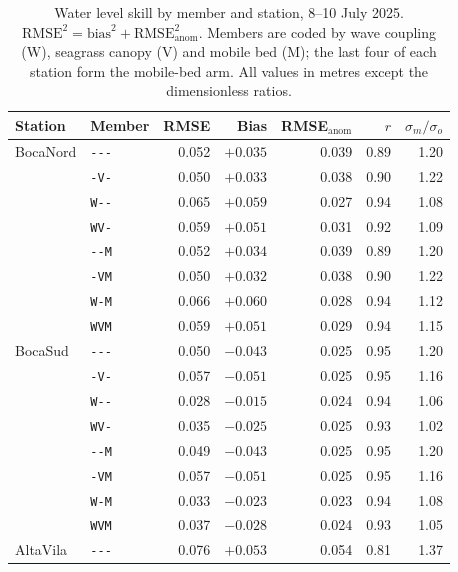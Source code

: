 \begin{table}[H]
  \centering
  \caption{Water level skill by member and station, 8--10 July 2025.
  $\mathrm{RMSE}^2 = \mathrm{bias}^2 + \mathrm{RMSE}_{\mathrm{anom}}^2$. Members
  are coded by wave coupling (W), seagrass canopy (V) and mobile bed (M); the
  last four of each station form the mobile-bed arm. All values in metres
  except the dimensionless ratios.}
  \label{tab:wl}
  \begin{tabular}{llrrrrr}
    \toprule
    Station & Member & RMSE & Bias & RMSE$_{\mathrm{anom}}$ & $r$ & $\sigma_m/\sigma_o$ \\
    \midrule
    BocaNord & \texttt{{-}{-}{-}}  & 0.052 & $+0.035$ & 0.039 & 0.89 & 1.20 \\
             & \texttt{{-}V{-}}    & 0.050 & $+0.033$ & 0.038 & 0.90 & 1.22 \\
             & \texttt{W{-}{-}}    & 0.065 & $+0.059$ & 0.027 & 0.94 & 1.08 \\
             & \texttt{WV{-}}      & 0.059 & $+0.051$ & 0.031 & 0.92 & 1.09 \\
             & \texttt{{-}{-}M}    & 0.052 & $+0.034$ & 0.039 & 0.89 & 1.20 \\
             & \texttt{{-}VM}      & 0.050 & $+0.032$ & 0.038 & 0.90 & 1.22 \\
             & \texttt{W{-}M}      & 0.066 & $+0.060$ & 0.028 & 0.94 & 1.12 \\
             & \texttt{WVM}        & 0.059 & $+0.051$ & 0.029 & 0.94 & 1.15 \\
    \midrule
    BocaSud  & \texttt{{-}{-}{-}}  & 0.050 & $-0.043$ & 0.025 & 0.95 & 1.20 \\
             & \texttt{{-}V{-}}    & 0.057 & $-0.051$ & 0.025 & 0.95 & 1.16 \\
             & \texttt{W{-}{-}}    & 0.028 & $-0.015$ & 0.024 & 0.94 & 1.06 \\
             & \texttt{WV{-}}      & 0.035 & $-0.025$ & 0.025 & 0.93 & 1.02 \\
             & \texttt{{-}{-}M}    & 0.049 & $-0.043$ & 0.025 & 0.95 & 1.20 \\
             & \texttt{{-}VM}      & 0.057 & $-0.051$ & 0.025 & 0.95 & 1.16 \\
             & \texttt{W{-}M}      & 0.033 & $-0.023$ & 0.023 & 0.94 & 1.08 \\
             & \texttt{WVM}        & 0.037 & $-0.028$ & 0.024 & 0.93 & 1.05 \\
    \midrule
    AltaVila & \texttt{{-}{-}{-}}  & 0.076 & $+0.053$ & 0.054 & 0.81 & 1.37 \\

\end{tabular}
\end{table}
